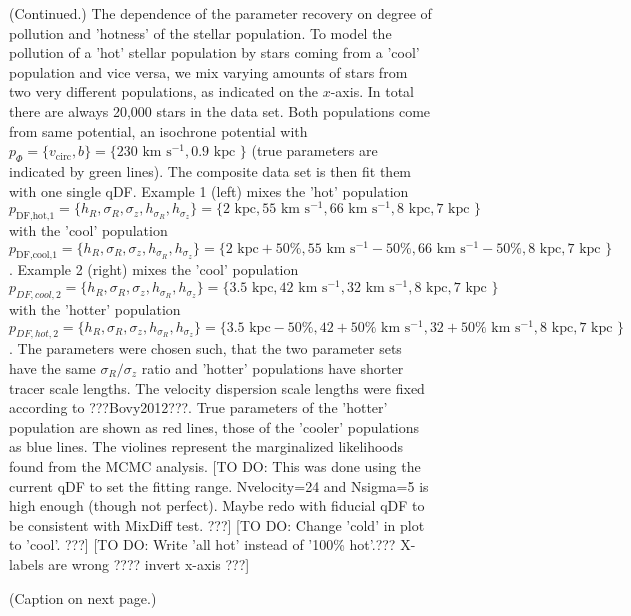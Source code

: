 \documentclass[12pt,preprint]{aastex}
\begin{document}
\addtocounter{figure}{-1}
\begin{figure} [t!]
  \caption{(Continued.)  The dependence of the parameter recovery on degree of pollution and 'hotness' of the stellar population. To model the pollution of a 'hot' stellar population by stars coming from a 'cool' population and vice versa, we mix varying amounts of stars from two very different populations, as indicated on the $x$-axis. In total there are always 20,000 stars in the data set. Both populations come from same potential, an isochrone potential with $p_\Phi = \{v_\text{circ},b \}=\{230 \text{ km s$^{-1}$},0.9\text{ kpc } \}$ (true parameters are indicated by green lines). The composite data set is then fit them with one single qDF. Example 1 (left) mixes the 'hot' population $p_\text{DF,hot,1} = \{ h_R, \sigma_R, \sigma_z,h_{\sigma_R},h_{\sigma_z}\} =\{2 \text{ kpc}, 55 \text{ km s$^{-1}$}, 66 \text{ km s$^{-1}$}, 8 \text{ kpc}, 7 \text{ kpc }\} $ with the 'cool' population $p_\text{DF,cool,1} = \{ h_R, \sigma_R, \sigma_z,h_{\sigma_R},h_{\sigma_z}\} =\{2 \text{ kpc}+50\%, 55 \text{ km s$^{-1}$}-50\%, 66 \text{ km s$^{-1}$}-50\%, 8 \text{ kpc}, 7 \text{ kpc }\}$. Example 2 (right) mixes the 'cool' population $p_{DF,cool,2} = \{ h_R, \sigma_R, \sigma_z,h_{\sigma_R},h_{\sigma_z}\} =\{3.5 \text{ kpc}, 42 \text{ km s$^{-1}$}, 32 \text{ km s$^{-1}$}, 8 \text{ kpc}, 7 \text{ kpc }\} $ with the 'hotter' population $p_{DF,hot,2} = \{ h_R, \sigma_R, \sigma_z,h_{\sigma_R},h_{\sigma_z}\} =\{3.5 \text{ kpc}-50\%, 42+50\% \text{ km s$^{-1}$}, 32+50\% \text{ km s$^{-1}$}, 8 \text{ kpc}, 7 \text{ kpc }\} $. The parameters were chosen such, that the two parameter sets have the same $\sigma_R/\sigma_z$ ratio and 'hotter' populations have shorter tracer scale lengths. The velocity dispersion scale lengths were fixed according to ???Bovy2012???. True parameters of the 'hotter' population are shown as red lines, those of the 'cooler' populations as blue lines. The violines represent the marginalized likelihoods found from the MCMC analysis. [TO DO: This was done using the current qDF to set the fitting range. Nvelocity=24 and Nsigma=5 is high enough (though not perfect). Maybe redo with fiducial qDF to be consistent with MixDiff test. ???] [TO DO: Change 'cold' in plot to 'cool'. ???] [TO DO: Write 'all hot' instead of '100\% hot'.??? X-labels are wrong ???? invert x-axis ???]}
\end{figure}


\begin{figure}
\caption{(Caption on next page.)}
\label{fig:isoSphFlexMixDiff}
\end{figure}
\end{document}
